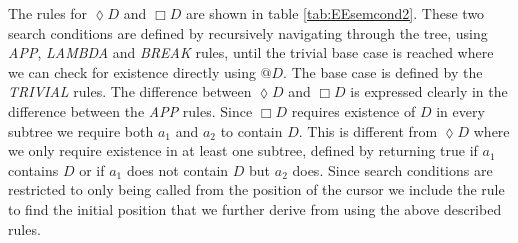 The rules for $\lozenge D$ and $\Box D$ are shown in table \ref{tab:EEsemcond2}. These two search conditions are defined by recursively navigating through the tree, using \textit{APP}, \textit{LAMBDA} and \textit{BREAK} rules, until the trivial base case is reached where we can check for existence directly using $@D$. The base case is defined by the \textit{TRIVIAL} rules. The difference between $\lozenge D$ and $\Box D$ is expressed clearly in the difference between the \textit{APP} rules. Since $\Box D$ requires existence of $D$ in every subtree we require both $a_1$ and $a_2$ to contain $D$. This is different from $\lozenge D$ where we only require existence in at least one subtree, defined by returning true if $a_1$ contains $D$ or if $a_1$ does not contain $D$ but $a_2$ does. Since search conditions are restricted to only being called from the position of the cursor we include the rule  to find the initial position that we further derive from using the above described rules. \\
%
